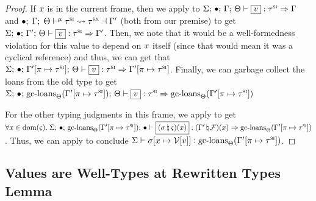 \begin{proof}
  If $x$ is in the current frame, then we apply
   to
  $\oxtypjudge{\oxglobalctx}{\oxemptyctx}{\oxkontctx}{\oxvarctx}{
    \oxvalue
  }{\oxsitype}{\oxvarctx}$ and
  $\bullet; \; \Gamma; \; \Theta \vdash^{\mu} \tau^\textsc{si} \leadsto \tau^\textsc{sx} \dashv \Gamma^\prime$ (both
  from our premise) to get
  $\oxtypjudge{\oxglobalctx}{\oxemptyctx}{\oxkontctx}{\oxvarctx^\prime}{
    \oxvalue
  }{\oxsitype}{\oxvarctx^\prime}$. Then, we note that it would be a well-formedness
  violation for this value to depend on $x$ itself (since that would mean it
  was a cyclical reference) and thus, we can get that
  $\oxtypjudge{\oxglobalctx}{\oxemptyctx}{\oxkontctx}{
    \oxtupdate{\oxvarctx^\prime}{\oxplace}{\oxsitype}
  }{
    \oxvalue
  }{\oxsitype}{
    \oxtupdate{\oxvarctx^\prime}{\oxplace}{\oxsitype}
  }$. Finally, we can garbage collect the loans from the old type to get
  $\oxtypjudge{\oxglobalctx}{\oxemptyctx}{\oxkontctx}{
    \oxgcloans{\oxkontctx}{\oxtupdate{\oxvarctx^\prime}{\oxplace}{\oxsitype}}
  }{
    \oxvalue
  }{\oxsitype}{
    \oxgcloans{\oxkontctx}{\oxtupdate{\oxvarctx^\prime}{\oxplace}{\oxsitype}}
  }$

  For the other typing judgments in this frame, we apply
   to get
  $\forall \oxid \in \oxdomain{\oxstackframe}. \;
  \oxtypjudge{\oxglobalctx}{\oxemptyctx}{\oxemptyctx}{
    \oxgcloans{\oxkontctx}{\oxtupdate{\oxvarctx^\prime}{\oxplace}{\oxsitype}}
  }{
    (\oxnewframe{\oxstore}{\oxstackframe})(\oxid)
  }{(\oxnewframe{\oxvarctx^\prime}{\oxframe})(\oxid)}{
    \oxgcloans{\oxkontctx}{\oxtupdate{\oxvarctx^\prime}{\oxplace}{\oxsitype}}
  }$. Thus, we can apply  to conclude
  $\Sigma \vdash 
    \sigma [x \mapsto \mathcal{V}[v]]
   : 
    \textrm{gc-loans}_{\Theta}(\Gamma^\prime [\pi \mapsto \tau^\textsc{si}])
  $.
\end{proof}

\subsection{Values are Well-Types at Rewritten Types Lemma}
\label{sec:values-typed-supertype-lemma}


